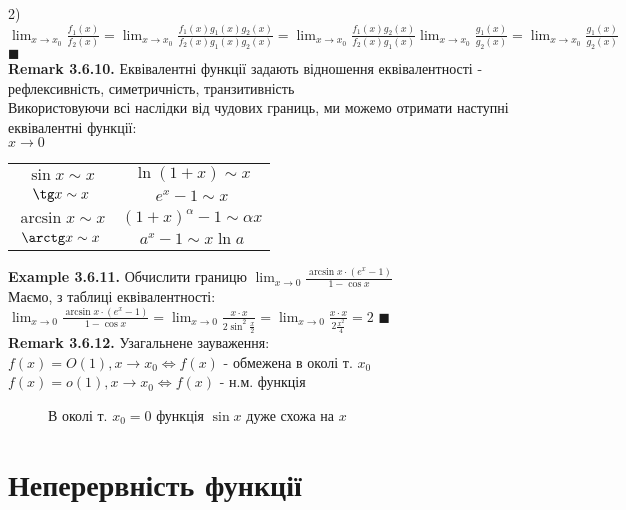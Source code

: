 \documentclass[a4paper, 14pt]{extarticle}
\def\huge{\displaystyle}
\def\bigline{\vspace{5mm}\\}
\def\ex#1{\textbf{Example {#1}}}
\def\rm#1{\textbf{Remark {#1}}}
\def\bigline{\vspace{5mm}\\}
\def\qed{$\blacksquare$}
\begin{document}
2) $\huge \lim_{x \to x_0} \frac{f_1(x)}{f_2(x)} = \lim_{x \to x_0} \frac{f_1(x)g_1(x)g_2(x)}{f_2(x)g_1(x)g_2(x)} = \lim_{x \to x_0} \frac{f_1(x)g_2(x)}{f_2(x)g_1(x)} \lim_{x \to x_0} \frac{g_1(x)}{g_2(x)} = \lim_{x \to x_0} \frac{g_1(x)}{g_2(x)}$ \qed
\bigline
\rm{3.6.10.} Еквівалентні функції задають відношення еквівалентності - рефлексивність, симетричність, транзитивність
\bigline
Використовуючи всі наслідки від чудових границь, ми можемо отримати наступні еквівалентні функції:\\
$x \to 0$
\begin{center}
\begin{tabular}{ c c }
 $\sin x \sim x$ & $\ln(1+x) \sim x$ \\ 
 $\tg x \sim x$ & $e^x - 1 \sim x$ \\
 $\arcsin x \sim x$ & $(1+x)^\alpha - 1 \sim \alpha x$ \\
 $\arctg x \sim x$ & $a^x - 1 \sim x \ln a$ \\ 
\end{tabular}
\end{center}

\ex{3.6.11.} Обчислити границю $\huge \lim_{x \to 0} \frac{\arcsin x \cdot (e^x - 1)}{1 - \cos x}$\\
Маємо, з таблиці еквівалентності:\\
$\huge \lim_{x \to 0} \frac{\arcsin x \cdot (e^x - 1)}{1 - \cos x} = \lim_{x \to 0} \frac{x \cdot x}{2 \sin^2 \frac{x}{2}} = \lim_{x \to 0} \frac{x \cdot x}{2 \frac{x^2}{4}} = 2$ \qed
\bigline
\rm{3.6.12.} Узагальнене зауваження:\\
$f(x) = O(1), x \to x_0 \iff f(x)$ - обмежена в околі т. $x_0$\\
$f(x) = o(1), x \to x_0 \iff f(x)$ - н.м. функція
\begin{figure} [H]
\centering
{
\caption*{В околі т. $x_0 = 0$ функція $\sin x$ дуже схожа на $x$}
}
\end{figure}
\newpage
\section{Неперервність функції}
\end{document}
